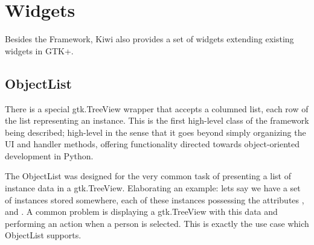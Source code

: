 \documentclass[a4paper]{howto}
\begin{document}
\section{Widgets}

Besides the Framework, Kiwi also provides a set of widgets extending
existing widgets in GTK+.







\subsection{ObjectList}

There is a special gtk.TreeView wrapper that accepts a columned list,
each row of the list representing an instance. This is the first
high-level class of the framework being described; high-level in the
sense that it goes beyond simply organizing the UI and handler methods,
offering functionality directed towards object-oriented development in
Python.

The ObjectList was designed for the very common task of presenting a
list of instance data in a gtk.TreeView. Elaborating an example: lets say we
have a set of  instances stored somewhere, each of these
instances possessing the attributes ,  and
. A common problem is displaying a gtk.TreeView with this data
and performing an action when a person is selected. This is exactly the
use case which ObjectList supports.
\end{document}
